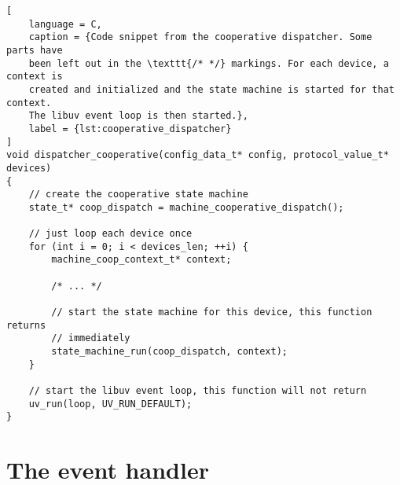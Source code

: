 \begin{lstlisting}[
    language = C,
    caption = {Code snippet from the cooperative dispatcher. Some parts have
    been left out in the \texttt{/* */} markings. For each device, a context is
    created and initialized and the state machine is started for that context.
    The libuv event loop is then started.},
    label = {lst:cooperative_dispatcher}
]
void dispatcher_cooperative(config_data_t* config, protocol_value_t* devices)
{
    // create the cooperative state machine
    state_t* coop_dispatch = machine_cooperative_dispatch();

    // just loop each device once
    for (int i = 0; i < devices_len; ++i) {
        machine_coop_context_t* context;

        /* ... */

        // start the state machine for this device, this function returns
        // immediately
        state_machine_run(coop_dispatch, context);
    }

    // start the libuv event loop, this function will not return
    uv_run(loop, UV_RUN_DEFAULT);
}
\end{lstlisting}

\section{The event handler}



